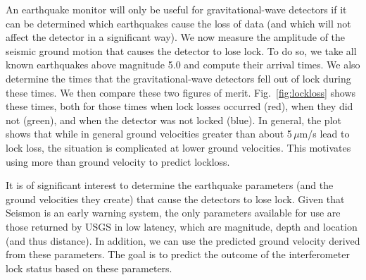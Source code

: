 \documentclass[reprint, prl, aps, showpacs]{revtex4-1}
\newcommand{\seismon}{\textnormal{Seismon }}
\begin{document}
An earthquake monitor will only be useful for gravitational-wave detectors if it can be determined which earthquakes cause the loss of data (and which will not affect the detector in a significant way).
We now measure the amplitude of the seismic ground motion that causes the detector to lose lock. To do so, we take all known earthquakes above magnitude 5.0 and compute their arrival times. 
We also determine the times that the gravitational-wave detectors fell out of lock during these times. 
We then compare these two figures of merit. 
Fig.~\ref{fig:lockloss} shows these times, both for those times when lock losses occurred (red), when they did not (green), and when the detector was not locked (blue). 
In general, the plot shows that while in general ground velocities greater than about 5\,$\mu$m/s lead to lock loss, the situation is complicated at lower ground velocities. This motivates using more than ground velocity to predict lockloss.


It is of significant interest to determine the earthquake parameters (and the ground velocities they create) that cause the detectors to lose lock.
Given that \seismon is an early warning system, the only parameters available for use are those returned by USGS in low latency, which are magnitude, depth and location (and thus distance). 
In addition, we can use the predicted ground velocity derived from these parameters.
The goal is to predict the outcome of the interferometer lock status based on these parameters.
\end{document}
